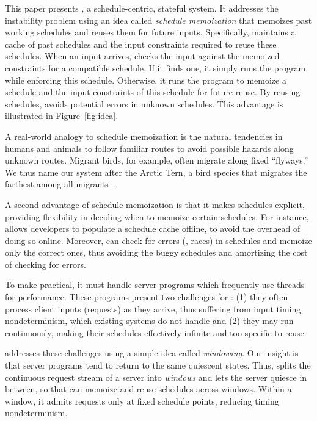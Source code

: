 This paper presents \tern, a schedule-centric, stateful \dmt system.  It
addresses the instability problem using an idea called \emph{schedule
  memoization} that memoizes past working schedules and reuses them for
future inputs.  Specifically, \tern maintains a cache of past schedules and
the input constraints required to reuse these schedules.  When an input arrives,
\tern checks the input against the memoized constraints for a compatible
schedule.  If it finds one, it simply runs the program while enforcing
this schedule.  Otherwise, it runs the program to memoize a schedule and
the input constraints of this schedule for future reuse.  By reusing
schedules, \tern avoids potential errors in unknown schedules.  This
advantage is illustrated in Figure~\ref{fig:idea}.

A real-world analogy to schedule memoization is the natural tendencies in
humans and animals to follow familiar routes to avoid possible hazards
along unknown routes.  Migrant birds, for example, often migrate along
fixed ``flyways.''  We thus name our system after the Arctic Tern, a bird
species that migrates the farthest among all migrants~\cite{artic-tern-wiki}.  

A second advantage of schedule memoization is that it makes schedules
explicit, providing flexibility in deciding when to memoize certain
schedules.  For instance, \tern allows developers to populate a schedule
cache offline, to avoid the overhead of doing so online.  Moreover,
\tern can check for errors (\eg, races) in schedules and memoize only the
correct ones, thus avoiding the buggy schedules and amortizing the
cost of checking for errors.

To make \tern practical, it must handle server programs which frequently
use threads for performance.  These programs present two challenges for
\tern: (1) they often process client inputs (requests) as they arrive, thus
suffering from input timing nondeterminism, which existing \dmt systems do
not handle and (2) they may run continuously, making their schedules
effectively infinite and too specific to reuse.

\tern addresses these challenges using a simple idea called
\emph{windowing}.  Our insight is that server programs tend to return to the
same quiescent states.
Thus, \tern splits the continuous request stream of a server into
\emph{windows} and lets the server quiesce in between, so that \tern can
memoize and reuse schedules across windows.  Within a window, it admits
requests only at fixed schedule points, reducing timing nondeterminism.

